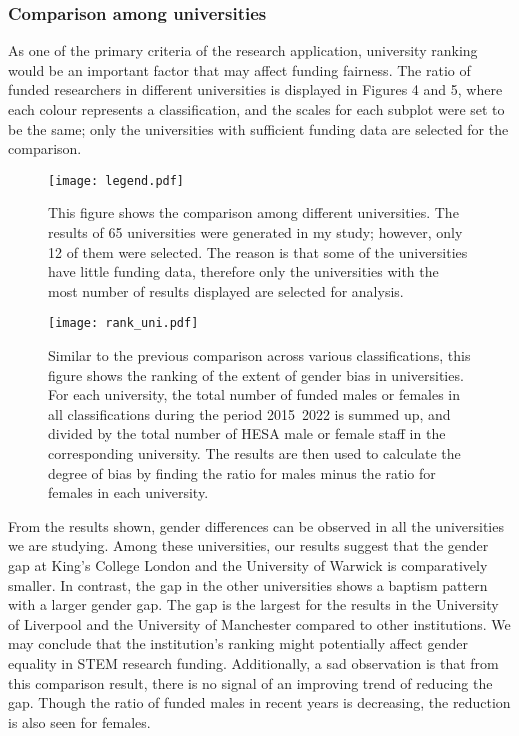 \subsubsection{Comparison among universities}
As one of the primary criteria of the research application, university ranking would be an important factor that may affect funding fairness. The ratio of funded researchers in different universities is displayed in Figures 4 and 5, where each colour represents a classification, and the scales for each subplot were set to be the same; only the universities with sufficient funding data are selected for the comparison.
\begin{figure}
\caption{This figure shows the comparison among different universities. The results of 65 universities were generated in my study; however, only 12 of them were selected. The reason is that some of the universities have little funding data, therefore only the universities with the most number of results displayed are selected for analysis.}
\texttt{[image: legend.pdf]}
\end{figure}

\begin{figure}
	\centering
	\texttt{[image: rank\_uni.pdf]}
	\caption{Similar to the previous comparison across various classifications, this figure shows the ranking of the extent of gender bias in universities. For each university, the total number of funded males or females in all classifications during the period 2015~2022 is summed up, and divided by the total number of HESA male or female staff in the corresponding university. The results are then used to calculate the degree of bias by finding the ratio for males minus the ratio for females in each university.}
\end{figure}

\noindent From the results shown, gender differences can be observed in all the universities we are studying. Among these universities, our results suggest that the gender gap at King's College London and the University of Warwick is comparatively smaller. In contrast, the gap in the other universities shows a baptism pattern with a larger gender gap. The gap is the largest for the results in the University of Liverpool and the University of Manchester compared to other institutions. We may conclude that the institution's ranking might potentially affect gender equality in STEM research funding. Additionally, a sad observation is that from this comparison result, there is no signal of an improving trend of reducing the gap. Though the ratio of funded males in recent years is decreasing, the reduction is also seen for females.

\pagebreak